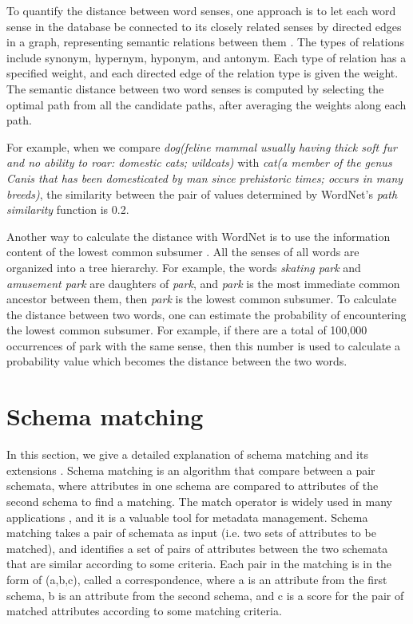 To quantify the distance between word senses, one approach is to let each word sense in the database be connected to its closely related senses by directed edges in a graph, representing semantic relations between them \cite{cruz2005role}. The types of relations include synonym, hypernym, hyponym, and antonym. Each type of relation has a specified weight, and each directed edge of the relation type is given the weight. The semantic distance between two word senses is computed by selecting the optimal path from all the candidate paths, after averaging the weights along each path.

For example, when we compare \textit{dog(feline mammal usually having thick soft fur and no ability to roar: domestic cats; wildcats)} with \textit{cat(a member of the genus Canis that has been domesticated by man since prehistoric times; occurs in many breeds)}, the similarity between the pair of values determined by WordNet's \textit{path similarity} function is 0.2.

Another way to calculate the distance with WordNet is to use the information content of the lowest common subsumer \cite{Resnik1970Using}. All the senses of all words are organized into a tree hierarchy. For example, the words \textit{skating park} and \textit{amusement park} are daughters of \textit{park}, and \textit{park} is the most immediate common ancestor between them, then \textit{park} is the lowest common subsumer. To calculate the distance between two words, one can estimate the probability of encountering the lowest common subsumer. For example, if there are a total of 100,000 occurrences of park with the same sense, then this number is used to calculate a probability value which becomes the distance between the two words.

\section{Schema matching}
\label{sec:SchemaMatching}

In this section, we give a detailed explanation of schema matching and its extensions \cite{Sorrentino2011NORMS}. Schema matching is an algorithm that compare between a pair schemata, where attributes in one schema are compared to attributes of the second schema to find a matching. The match operator is widely used in many applications \cite{Dong2012Proceedings,Rahm2001Survey,10.1145/3183713.3183729}, and it is a valuable tool for metadata management. Schema matching takes a pair of schemata as input (i.e. two sets of attributes to be matched), and identifies a set of pairs of attributes between the two schemata that are similar according to some criteria. Each pair in the matching is in the form of (a,b,c), called a correspondence, where a is an attribute from the first schema, b is an attribute from the second schema, and c is a score for the pair of matched attributes according to some matching criteria.

